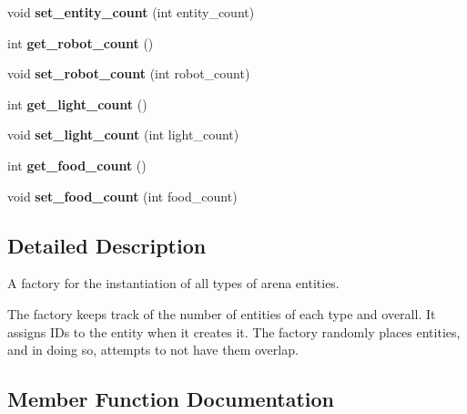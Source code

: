 \begin{DoxyCompactItemize}
\mbox{\label{class_entity_factory_a51a6685d0a6d529f1b3ea7538fa2fb97}} 
void {\bfseries set\+\_\+entity\+\_\+count} (int entity\+\_\+count)
\item 
\mbox{\label{class_entity_factory_acc8d2184f834fe2f663fea781b6aba80}} 
int {\bfseries get\+\_\+robot\+\_\+count} ()
\item 
\mbox{\label{class_entity_factory_abdb8ab57e9a0faa3ce2add10da2380e7}} 
void {\bfseries set\+\_\+robot\+\_\+count} (int robot\+\_\+count)
\item 
\mbox{\label{class_entity_factory_a6e949ab2d1b1dc788715889a881c08b2}} 
int {\bfseries get\+\_\+light\+\_\+count} ()
\item 
\mbox{\label{class_entity_factory_a087936314af6334242d270cda1bf8209}} 
void {\bfseries set\+\_\+light\+\_\+count} (int light\+\_\+count)
\item 
\mbox{\label{class_entity_factory_ad70396eb638676d5a833be3327f62554}} 
int {\bfseries get\+\_\+food\+\_\+count} ()
\item 
\mbox{\label{class_entity_factory_ab1097be73754ac0aa8debb680c216e9d}} 
void {\bfseries set\+\_\+food\+\_\+count} (int food\+\_\+count)
\end{DoxyCompactItemize}


\subsection{Detailed Description}
A factory for the instantiation of all types of arena entities. 

The factory keeps track of the number of entities of each type and overall. It assigns ID\textquotesingle{}s to the entity when it creates it. The factory randomly places entities, and in doing so, attempts to not have them overlap. 

\subsection{Member Function Documentation}
\mbox{\label{class_entity_factory_af8366cb210cfb13f94b8eeb502e805fc}} 
